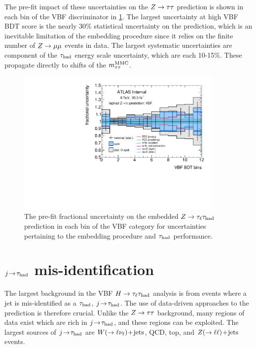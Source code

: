 The pre-fit impact of these uncertainties on the $Z\rightarrow\tau\tau$ prediction is shown in each bin of the VBF discriminator in \cref{fig:backgrounds-uncertainties-Ztautau}. The largest uncertainty at high VBF BDT score is the nearly 30\% statistical uncertainty on the prediction, which is an inevitable limitation of the embedding procedure since it relies on the finite number of $Z \rightarrow \mu\mu$ events in data. The largest systematic uncertainties are component of the $\tau_\text{had}$ energy scale uncertainty, which are each 10-15\%. These propagate directly to shifts of the $m_{\tau\tau}^\text{MMC}$.

\begin{figure}[tp]
  \includegraphics[width=0.90\textwidth]{figures/uncertainties/uncertainties_lephad_paper14_8TeV_Ztautau_VBF}
  \caption{The pre-fit fractional uncertainty on the embedded $Z\rightarrow\tau_\ell\tau_\text{had}$ prediction in each bin of the VBF category for uncertainties pertaining to the embedding procedure and $\tau_\text{had}$ performance.}
  \label{fig:backgrounds-uncertainties-Ztautau}
\end{figure}

\clearpage
\section{$j\!\rightarrow\!\tau_\text{had}$ mis-identification}
\label{sec:backgrounds-misid}

The largest background in the VBF $H\rightarrow\tau_\ell\tau_\text{had}$ analysis is from events where a jet is mis-identified as a $\tau_\text{had}$, $j\!\rightarrow\!\tau_\text{had}$. The use of data-driven approaches to the prediction is therefore crucial. Unlike the $Z\rightarrow\tau\tau$ background, many regions of data exist which are rich in $j\!\rightarrow\!\tau_\text{had}$, and these regions can be exploited. The largest sources of $j\!\rightarrow\!\tau_\text{had}$ are $W (\rightarrow \ell\nu_\ell)\!+\!\text{jets}$, QCD, top, and $Z (\rightarrow \ell\ell)\!+\!\text{jets}$ events.

